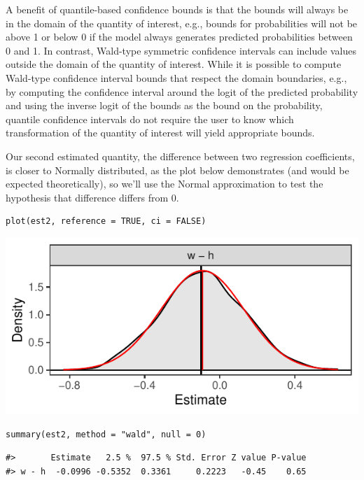 A benefit of quantile-based confidence bounds is that the bounds will always be in the domain of the quantity of interest, e.g., bounds for probabilities will not be above 1 or below 0 if the model always generates predicted probabilities between 0 and 1. In contrast, Wald-type symmetric confidence intervals can include values outside the domain of the quantity of interest. While it is possible to compute Wald-type confidence interval bounds that respect the domain boundaries, e.g., by computing the confidence interval around the logit of the predicted probability and using the inverse logit of the bounds as the bound on the probability, quantile confidence intervals do not require the user to know which transformation of the quantity of interest will yield appropriate bounds.

Our second estimated quantity, the difference between two regression coefficients, is closer to Normally distributed, as the plot below demonstrates (and would be expected theoretically), so we'll use the Normal approximation to test the hypothesis that difference differs from 0.

\begin{verbatim}
plot(est2, reference = TRUE, ci = FALSE)
\end{verbatim}

\begin{center}\includegraphics{figures/unnamed-chunk-10-1} \end{center}

\begin{verbatim}
summary(est2, method = "wald", null = 0)
\end{verbatim}

\begin{verbatim}
#>       Estimate   2.5 %  97.5 % Std. Error Z value P-value
#> w - h  -0.0996 -0.5352  0.3361     0.2223   -0.45    0.65
\end{verbatim}

